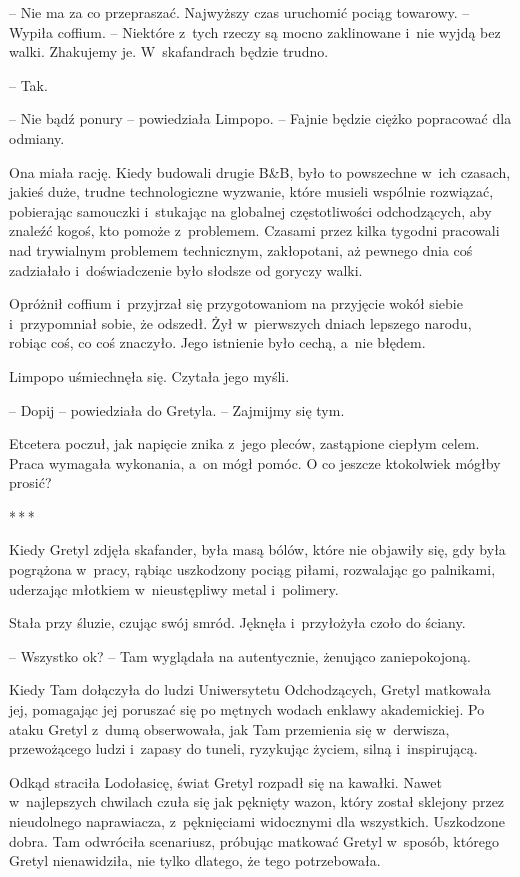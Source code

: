 \documentclass[oneside,polish,11pt,sfheadings]{mwbk}
\newcommand{\threeast}{\bigskip\par\centerline{*\,*\,*}\medskip\par}
\begin{document}
-- Nie ma za co przepraszać. Najwyższy czas uruchomić pociąg towarowy. -- Wypiła coffium. -- Niektóre z~tych rzeczy są mocno zaklinowane i~nie
wyjdą bez walki. Zhakujemy je. W~skafandrach będzie trudno.

-- Tak.

-- Nie bądź ponury -- powiedziała Limpopo. -- Fajnie będzie ciężko
popracować dla odmiany.

Ona miała rację. Kiedy budowali drugie B\&B, było to powszechne w~ich
czasach, jakieś duże, trudne technologiczne wyzwanie, które musieli
wspólnie rozwiązać, pobierając samouczki i~stukając na globalnej
częstotliwości odchodzących, aby znaleźć kogoś, kto pomoże z~problemem.
Czasami przez kilka tygodni pracowali nad trywialnym problemem
technicznym, zakłopotani, aż pewnego dnia coś zadziałało i~doświadczenie
było słodsze od goryczy walki.

Opróżnił coffium i~przyjrzał się przygotowaniom na przyjęcie wokół
siebie i~przypomniał sobie, że odszedł. Żył w~pierwszych dniach lepszego
narodu, robiąc coś, co coś znaczyło. Jego istnienie było cechą, a~nie
błędem.

Limpopo uśmiechnęła się. Czytała jego myśli.

-- Dopij -- powiedziała do Gretyla. -- Zajmijmy się tym.

Etcetera poczuł, jak napięcie znika z~jego pleców, zastąpione ciepłym
celem. Praca wymagała wykonania, a~on mógł pomóc. O co jeszcze
ktokolwiek mógłby prosić?

\threeast

Kiedy Gretyl zdjęła skafander, była masą bólów, które nie objawiły się,
gdy była pogrążona w~pracy, rąbiąc uszkodzony pociąg piłami, rozwalając
go palnikami, uderzając młotkiem w~nieustępliwy metal i~polimery.

Stała przy śluzie, czując swój smród. Jęknęła i~przyłożyła czoło do
ściany.

-- Wszystko ok? -- Tam wyglądała na autentycznie, żenująco zaniepokojoną.

Kiedy Tam dołączyła do ludzi Uniwersytetu Odchodzących, Gretyl matkowała
jej, pomagając jej poruszać się po mętnych wodach enklawy akademickiej.
Po ataku Gretyl z~dumą obserwowała, jak Tam przemienia się w~derwisza,
przewożącego ludzi i~zapasy do tuneli, ryzykując życiem, silną i~inspirującą.

Odkąd straciła Lodołasicę, świat Gretyl rozpadł się na kawałki. Nawet w~najlepszych chwilach czuła się jak pęknięty wazon, który został sklejony
przez nieudolnego naprawiacza, z~pęknięciami widocznymi dla wszystkich.
Uszkodzone dobra. Tam odwróciła scenariusz, próbując matkować Gretyl w~sposób, którego Gretyl nienawidziła, nie tylko dlatego, że tego
potrzebowała.
\end{document}

